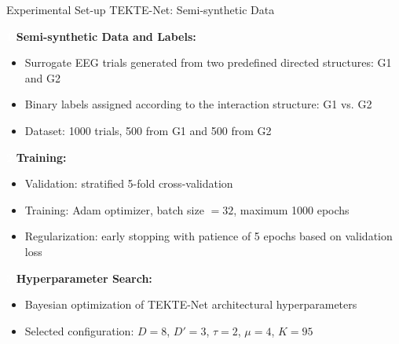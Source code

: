 \documentclass[aspectratio=169]{beamer}
\begin{document}
\begin{frame}{Experimental Set-up TEKTE-Net: Semi-synthetic Data}

\setlength{\leftmargini}{1.4em}
\setlength{\leftmarginii}{1.2em}
\setlength{\fboxsep}{1.2pt}

\vspace{0.30cm}

\noindent
\colorbox{frameblue}{\textcolor{white}{\textbf{\scriptsize 1}}}
\hspace{0.12cm}
\textbf{\normalsize Semi-synthetic Data and Labels:}

\vspace{0.04cm}

\begin{itemize}\itemsep2pt
    \item Surrogate EEG trials generated from two predefined directed structures: G1 and G2
    \item Binary labels assigned according to the interaction structure: G1 vs. G2
    \item Dataset: 1000 trials, 500 from G1 and 500 from G2
\end{itemize}

\vspace{0.10cm}

\noindent
\colorbox{frameblue}{\textcolor{white}{\textbf{\scriptsize 2}}}
\hspace{0.12cm}
\textbf{\normalsize Training:}

\vspace{0.04cm}

\begin{itemize}\itemsep2pt
    \item Validation: stratified 5-fold cross-validation
    \item Training: Adam optimizer, batch size $=32$, maximum 1000 epochs
    \item Regularization: early stopping with patience of 5 epochs based on validation loss
\end{itemize}

\vspace{0.10cm}

\noindent
\colorbox{frameblue}{\textcolor{white}{\textbf{\scriptsize 3}}}
\hspace{0.12cm}
\textbf{\normalsize Hyperparameter Search:}

\vspace{0.04cm}

\begin{itemize}\itemsep2pt
    \item Bayesian optimization of TEKTE-Net architectural hyperparameters
    \item Selected configuration: $D=8$, $D'=3$, $\tau=2$, $\mu=4$, $K=95$
\end{itemize}
\end{frame}
\end{document}
